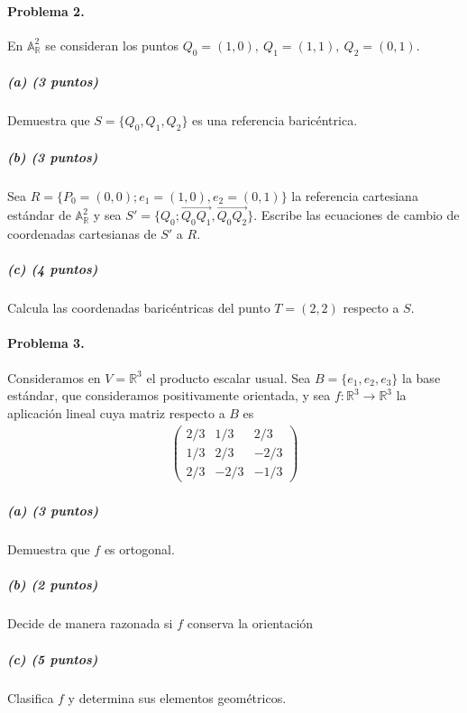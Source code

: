 \documentclass[14pt]{book}
\begin{document}
\paragraph{Problema 2.} En $\mathbb{A}_\mathbb{R}^2$ se consideran los puntos $Q_0 = (1, 0),\ Q_1 = (1,1),\ Q_2 = (0,1)$.

\subparagraph{(a) (3 puntos)} Demuestra que $S = \{Q_0, Q_1, Q_2\}$ es una referencia baricéntrica.
\subparagraph{(b) (3 puntos)} Sea $R = \{P_0 = (0,0); e_1 = (1, 0), e_2 = (0,1)\}$ la referencia cartesiana estándar de $\mathbb{A}_\mathbb{R}^2$ y sea $S' = \{Q_0; \overrightarrow{Q_0 Q_1}, \overrightarrow{Q_0 Q_2}\}$. Escribe las ecuaciones de cambio de coordenadas cartesianas de $S'$ a $R$.
\subparagraph{(c) (4 puntos)} Calcula las coordenadas baricéntricas del punto $T = (2,2)$ respecto a $S$.

\paragraph{Problema 3.} Consideramos en $V = \mathbb{R}^3$ el producto escalar usual. Sea $B = \{e_1, e_2, e_3\}$ la base estándar, que consideramos positivamente orientada, y sea $f : \mathbb{R}^3 \to \mathbb{R}^3$ la aplicación lineal cuya matriz respecto a $B$ es
\begin{align*}
	\left(\begin{array}{ccc}
	2/3 & 1/3 & 2/3 \\
	1/3 & 2/3 & -2/3 \\
	2/3 & -2/3 & -1/3
	\end{array}\right)
\end{align*}

\subparagraph{(a) (3 puntos)} Demuestra que $f$ es ortogonal.
\subparagraph{(b) (2 puntos)} Decide de manera razonada si $f$ conserva la orientación
\subparagraph{(c) (5 puntos)} Clasifica $f$ y determina sus elementos geométricos.
\end{document}
